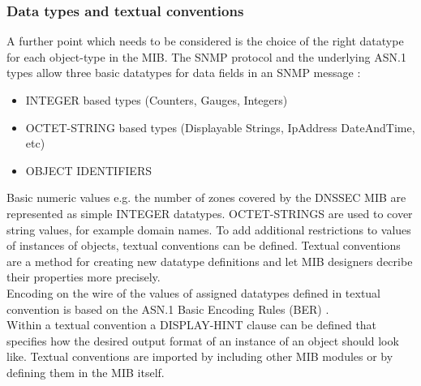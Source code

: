 \subsubsection{Data types and textual conventions}

A further point which needs to be considered is the choice of the right datatype for each object-type in the MIB. The SNMP protocol and the underlying ASN.1 types allow three basic datatypes for data fields in an SNMP message \cite{snmp-wire}:
\\
\begin{itemize}
\item
INTEGER based types (Counters, Gauges, Integers)
\item
OCTET-STRING based types (Displayable Strings, IpAddress DateAndTime, etc)
\item
OBJECT IDENTIFIERS
\end{itemize}

Basic numeric values e.g. the number of zones covered by the DNSSEC MIB are represented as simple INTEGER datatypes. OCTET-STRINGS are used to cover string values, for example domain names. To add additional restrictions to values of instances of objects, textual conventions can be defined. Textual conventions are a method for creating new datatype definitions and let MIB designers decribe their properties more precisely. 
\\
Encoding on the wire of the values of assigned  datatypes  defined in textual convention is based on the ASN.1 Basic Encoding Rules (BER) \cite{ber-asn1}  \cite{snmp-wire}.
\\
Within a textual convention a DISPLAY-HINT clause can be defined that specifies how the desired output format of an instance of an object should look like. Textual conventions are imported by including other MIB modules \cite{smi-tc} or by defining them in the MIB itself. 

